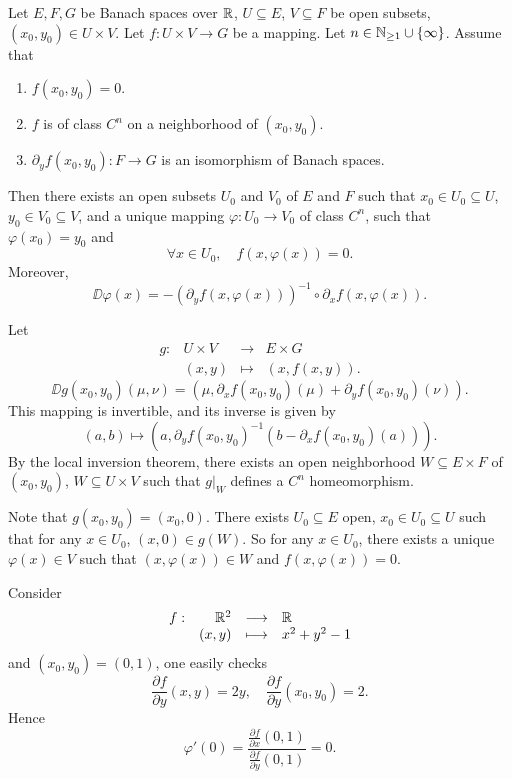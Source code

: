 \begin{theoremenv}
    Let $E,F,G$ be Banach spaces over $\mathbb{R}$, $U \subseteq E$, $V \subseteq F$ be open subsets, $(x_0,y_0) \in U \times V$.
    Let $f : U \times V \rightarrow G$ be a mapping.
    Let $n \in \mathbb{N}_{\ge 1} \cup \{\infty\}$.
    Assume that
    \begin{enumerate}[label=(\arabic*)]
        \item $f(x_0,y_0) = 0$.
        \item $f$ is of class $C^n$ on a neighborhood of $(x_0,y_0)$.
        \item $\partial_{y} f(x_0,y_0) : F \rightarrow G$ is an isomorphism of Banach spaces.
    \end{enumerate}
    Then there exists an open subsets $U_0$ and $V_0$ of $E$ and $F$ such that $x_0 \in U_0 \subseteq U$, $y_0 \in V_0 \subseteq V$,
    and a unique mapping $\varphi : U_0 \rightarrow V_0$ of class $C^n$, such that $\varphi(x_0) = y_0$ and
    $$\forall x \in U_0, \quad f(x, \varphi(x)) = 0.$$
    Moreover, 
    $$\DD \varphi(x) = - \left(\partial_{y} f(x,\varphi(x))\right)^{-1} \circ \partial_{x} f(x,\varphi(x)).$$
\end{theoremenv}
\begin{proofenv}
    Let
    $$\begin{array}{rrcl}
        g : & U \times V & \longrightarrow & E \times G\\
            & (x,y) & \longmapsto & (x, f(x,y)).
    \end{array}$$
    $$\DD g (x_0,y_0)(\mu,\nu) = (\mu,\partial_{x} f(x_0,y_0)(\mu) + \partial_{y} f(x_0,y_0)(\nu)).$$
    This mapping is invertible, and its inverse is given by
    $$(a,b) \longmapsto (a,\partial_{y} f(x_0,y_0)^{-1}(b - \partial_{x} f(x_0,y_0)(a))).$$
    By the local inversion theorem, there exists an open neighborhood $W \subseteq E \times F$ of $(x_0,y_0)$, $W \subseteq U \times V$ such that $g|_{W}$ defines a $C^n$ homeomorphism.
    
    \quad Note that $g(x_0,y_0) = (x_0,0)$.
    There exists $U_0 \subseteq E$ open, $x_0 \in U_0 \subseteq U$ such that for any $x \in U_0$, $(x,0) \in g(W)$.
    So for any $x \in U_0$, there exists a unique $\varphi(x) \in V$ such that $(x,\varphi(x)) \in W$ and $f(x,\varphi(x)) = 0$.
\end{proofenv}

\begin{exampleenv}
    Consider
    $$\begin{array}{rrcl}
        f : & \mathbb{R}^2 & \longrightarrow & \mathbb{R}\\
        & (x,y) & \longmapsto & x^2 + y^2 - 1
    \end{array}$$
    and $(x_0,y_0) = (0,1)$, one easily checks
    $$\frac{\partial f}{\partial y} (x,y) = 2y, \quad \frac{\partial f}{\partial y} (x_0,y_0) = 2.$$
    Hence
    $$\varphi'(0) = \frac{\frac{\partial f}{\partial x}(0,1)}{\frac{\partial f}{\partial y}(0,1)} = 0.$$
\end{exampleenv}

